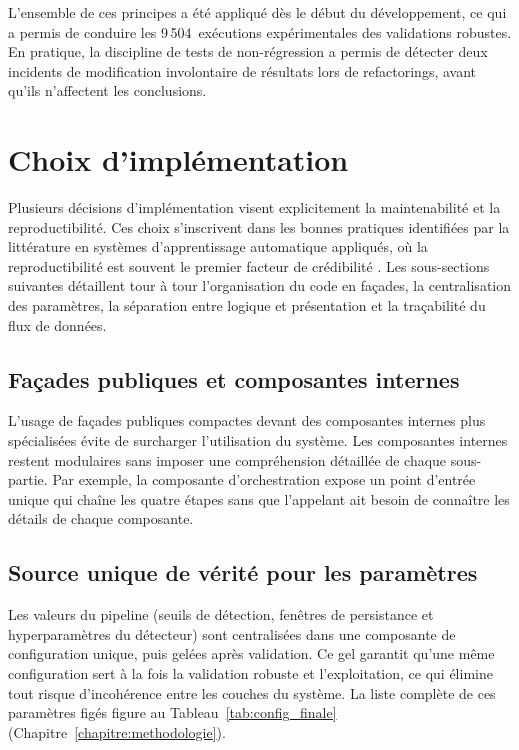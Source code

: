 L'ensemble de ces principes a été appliqué dès le début du développement, ce qui a permis de conduire
les 9\,504~exécutions expérimentales des validations robustes. En
pratique, la discipline de tests de non-régression a permis de détecter deux incidents de
modification involontaire de résultats lors de refactorings, avant qu'ils n'affectent les
conclusions.

\FloatBarrier
\section{Choix d'implémentation}

Plusieurs décisions d'implémentation visent explicitement la maintenabilité et la
reproductibilité. Ces choix s'inscrivent dans les bonnes pratiques identifiées par la
littérature en systèmes d'apprentissage automatique appliqués, où la reproductibilité est souvent le premier
facteur de crédibilité \citep{sculley2015hidden}. Les sous-sections suivantes détaillent tour à
tour l'organisation du code en façades, la centralisation des paramètres, la séparation entre
logique et présentation et la traçabilité du flux de données.

\subsection{Façades publiques et composantes internes}
L'usage de façades publiques compactes devant des composantes internes plus spécialisées
évite de surcharger l'utilisation du système. Les composantes internes restent modulaires
sans imposer une compréhension détaillée de chaque sous-partie. Par exemple, la composante
d'orchestration expose un point d'entrée unique qui chaîne les quatre étapes sans que
l'appelant ait besoin de connaître les détails de chaque composante.

\subsection{Source unique de vérité pour les paramètres}
Les valeurs du pipeline (seuils de détection, fenêtres de persistance et hyperparamètres du
détecteur) sont centralisées dans une composante de configuration unique, puis gelées après
validation. Ce gel garantit qu'une même configuration sert à la fois la validation robuste et
l'exploitation, ce qui élimine tout risque d'incohérence entre les couches du système. La liste
complète de ces paramètres figés figure au Tableau~\ref{tab:config_finale}
(Chapitre~\ref{chapitre:methodologie}).

